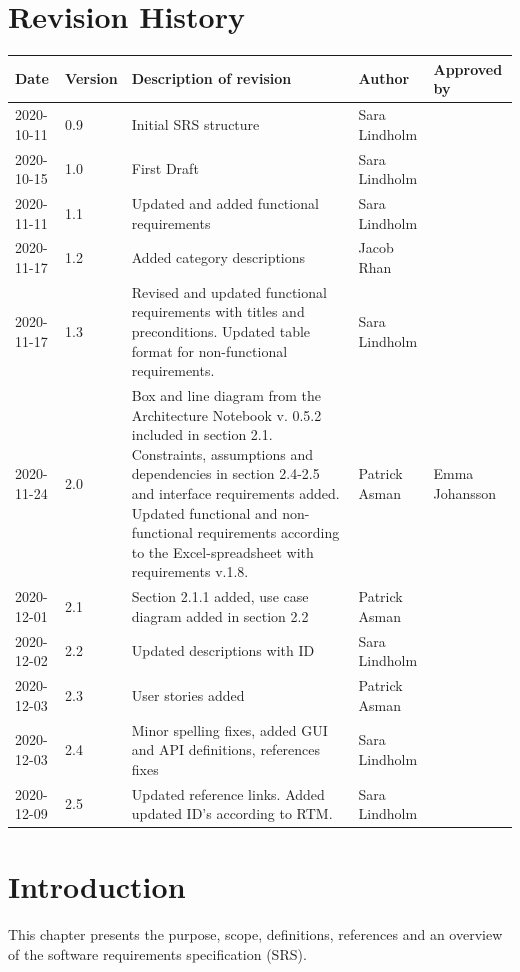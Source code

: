 \documentclass{scrreprt}
\begin{document}
\chapter*{Revision History}
\begin{center}
\begin{tabular}{|p{}|p{}|p{4.6cm}|p{2.5cm}|p{2.5cm}|}
 \hline
 \textbf{Date} & \textbf{Version} & \textbf{Description of revision} & \textbf{Author} & \textbf{Approved by} \\ 
 \hline
 2020-10-11 & 0.9 & Initial SRS structure & Sara Lindholm & \\
 \hline
 2020-10-15 & 1.0 & First Draft & Sara Lindholm & \\ 
 \hline
 2020-11-11 & 1.1 & Updated and added functional requirements & Sara Lindholm & \\
 \hline
 2020-11-17 & 1.2 & Added category descriptions & Jacob Rhan & \\
 \hline
 2020-11-17 & 1.3 & Revised and updated functional requirements with titles and preconditions. Updated table format for non-functional requirements. & Sara Lindholm & \\
 \hline 
 2020-11-24 & 2.0 & Box and line diagram from the Architecture Notebook v. 0.5.2 included in section 2.1. Constraints, assumptions and dependencies in section 2.4-2.5 and interface requirements added. Updated functional and non-functional requirements according to the Excel-spreadsheet with requirements v.1.8. & Patrick Asman & Emma Johansson \\
 \hline
 2020-12-01 & 2.1 & Section 2.1.1 added, use case diagram added in section 2.2 & Patrick Asman & \\
 \hline 
 2020-12-02 & 2.2 & Updated descriptions with ID & Sara Lindholm & \\
 \hline 
 2020-12-03 & 2.3 & User stories added & Patrick Asman & \\ 
 \hline 
 2020-12-03 & 2.4 & Minor spelling fixes, added GUI and API definitions, references fixes & Sara Lindholm & \\ 
 \hline 
 2020-12-09 & 2.5 & Updated reference links. Added updated ID's according to RTM. & Sara Lindholm & \\
 \hline 
\end{tabular}
\end{center}

\tableofcontents

\chapter{Introduction}
This chapter presents the purpose, scope, definitions, references and an overview of the software requirements specification (SRS). 
\end{document}
